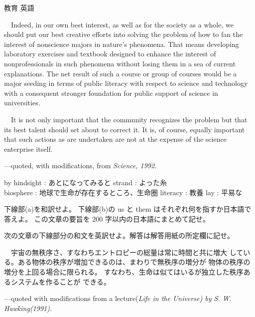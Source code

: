 \documentclass[fleqn]{jbook}
\begin{document}
\begin{question}{教育 英語}{}
\begin{subquestions}
  　Indeed, in our own best interest, as well as for the society as
  a whole, we should put our best creative efforts into solving the
  problem of how to fan the interest of nonscience majors in nature's
  phenomena. That means developing laboratory exercises and textbook
  designed to enhance the interest of nonprofessionals in such
  phenomena without losing them in a sea of current explanations.
  The net result of such a course or group of courses would be a
  major seeding in terms of public literacy with respect to science
  and technology with a consequent stronger foundation for public
  support of science in universities.

  　It is not only important that the community recognizes the problem
  but that its best talent should set about to correct it. It is, of
  course, equally important that such actions as are undertaken are
  not at the expense of the science enterprise itself.
%
  \begin{flushright}
    ---quoted, with modifications, from \em Science, \em 1992.
  \end{flushright}

  by hindsight : あとになってみると \quad
  strand : よった糸 \\
  biosphere : 地球で生命が存在するところ、生命圏 \quad
  literacy : 教養 \quad
  lay : 平易な
\baselineskip=15pt

  \noindent{[設問]}
  \begin{subsubquestions}
  \SubSubQuestion
    下線部(a)を和訳せよ。
  \SubSubQuestion
    下線部(b)の us と them はそれぞれ何を指すか日本語で答えよ。
  \SubSubQuestion
    この文章の要旨を 200 字以内の日本語にまとめて記せ。
  \end{subsubquestions}





\SubQuestion
  次の文章の下線部分の和文を英訳せよ。解答は解答用紙の所定欄に記せ。

  　宇宙の無秩序さ、すなわちエントロピーの総量は常に時間と共に増大
  している。ある物体の秩序が増加できるのは、まわりで無秩序の増分が
  物体の秩序の増分を上回る場合に限られる。
  すなわち、生命は似てはいるが独立した秩序あるシステムを作ることが
  できる。
%
  \begin{flushright}
    ---quoted with modifications from a lecture(\em Life in the Universe)
    \em by S. W. Hawking(1991).
  \end{flushright}


\end{subquestions}
\end{question}
\end{document}
